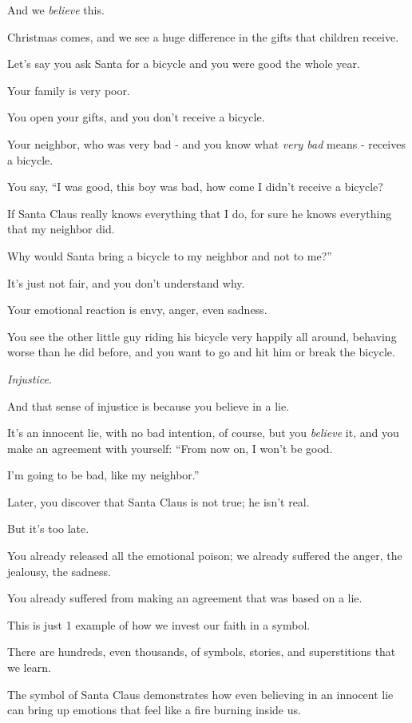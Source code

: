 \documentclass{article}
\numberwithin{equation}{section}
\begin{document}
And we \textit{believe} this.

Christmas comes, and we see a huge difference in the gifts that children receive.

Let's say you ask Santa for a bicycle and you were good the whole year.

Your family is very poor.

You open your gifts, and you don't receive a bicycle.

Your neighbor, who was very bad - and you know what \textit{very bad} means - receives a bicycle.

You say, ``I was good, this boy was bad, how come I didn't receive a bicycle?

If Santa Claus really knows everything that I do, for sure he knows everything that my neighbor did.

Why would Santa bring a bicycle to my neighbor and not to me?''

%
It's just not fair, and you don't understand why.

Your emotional reaction is envy, anger, even sadness.

You see the other little guy riding his bicycle very happily all around, behaving worse than he did before, and you want to go and hit him or break the bicycle.

\textit{Injustice}.

And that sense of injustice is because you believe in a lie.

It's an innocent lie, with no bad intention, of course, but you \textit{believe} it, and you make an agreement with yourself: ``From now on, I won't be good.

I'm going to be bad, like my neighbor.''

Later, you discover that Santa Claus is not true; he isn't real.

But it's too late.

You already released all the emotional poison; we already suffered the anger, the jealousy, the sadness.

You already suffered from making an agreement that was based on a lie.

%
This is just 1 example of how we invest our faith in a symbol.

There are hundreds, even thousands, of symbols, stories, and superstitions that we learn.

The symbol of Santa Claus demonstrates how even believing in an innocent lie can bring up emotions that feel like a fire burning inside us.
\end{document}
